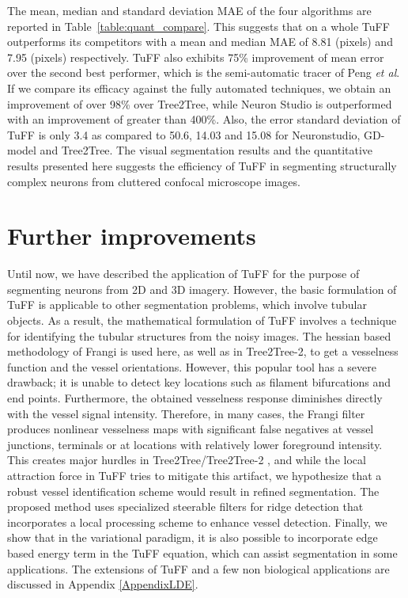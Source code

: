 The mean, median and standard deviation MAE of the four algorithms are reported in Table~\ref{table:quant_compare}. This suggests that on a whole TuFF outperforms its competitors with a mean and median MAE of 8.81 (pixels) and 7.95 (pixels) respectively. TuFF also exhibits 75\% improvement of mean error over the second best performer, which is the semi-automatic tracer of Peng \textit{et al}. If we compare its efficacy against the fully automated techniques, we obtain an improvement of over 98\% over Tree2Tree, while Neuron Studio is outperformed with an improvement of greater than 400\%. Also, the error standard deviation of TuFF is only 3.4 as compared to 50.6, 14.03 and 15.08 for Neuronstudio, GD-model and Tree2Tree. The visual segmentation results and the quantitative results presented here suggests the efficiency of TuFF in segmenting structurally complex neurons from cluttered confocal microscope images.

\section{Further improvements}

Until now, we have described the application of TuFF for the purpose of segmenting neurons from 2D and 3D imagery. However, the basic formulation of TuFF is applicable to other segmentation problems, which involve tubular objects. As a result, the mathematical formulation of TuFF involves a technique for identifying the tubular structures from the noisy images. The hessian based methodology of Frangi \cite{frangi_vesselness} is used here, as well as in Tree2Tree-2, to get a vesselness function and the vessel orientations. However, this popular tool has a severe drawback; it is unable to detect key locations such as filament bifurcations and end points. Furthermore, the obtained vesselness response diminishes directly with the vessel signal intensity. Therefore, in many cases, the Frangi filter produces nonlinear vesselness maps with significant false negatives at vessel junctions, terminals or at locations with relatively lower foreground intensity. This creates major hurdles in Tree2Tree/Tree2Tree-2 \cite{basu_T2T_journal,mukherjee_T2T_2}, and while the local attraction force in TuFF tries to mitigate this artifact, we hypothesize that a robust vessel identification scheme would result in refined segmentation. The proposed method uses specialized steerable filters for ridge detection that incorporates a local processing scheme to enhance vessel detection. Finally, we show that in the  variational paradigm, it is also possible to incorporate edge based energy term in the TuFF equation, which can assist segmentation in some applications.
The extensions of  TuFF and a few non biological applications are discussed in    Appendix \ref{AppendixLDE}. 


